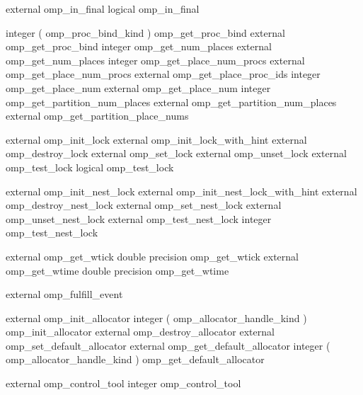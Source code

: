 {\begin{ompfSyntax}
      external omp_in_final
      logical omp_in_final

      integer ( omp_proc_bind_kind ) omp_get_proc_bind
      external omp_get_proc_bind
      integer omp_get_num_places
      external omp_get_num_places
      integer omp_get_place_num_procs
      external omp_get_place_num_procs
      external omp_get_place_proc_ids
      integer omp_get_place_num
      external omp_get_place_num
      integer omp_get_partition_num_places
      external omp_get_partition_num_places
      external omp_get_partition_place_nums

      external omp_init_lock
      external omp_init_lock_with_hint
      external omp_destroy_lock
      external omp_set_lock
      external omp_unset_lock
      external omp_test_lock
      logical omp_test_lock

      external omp_init_nest_lock
      external omp_init_nest_lock_with_hint
      external omp_destroy_nest_lock
      external omp_set_nest_lock
      external omp_unset_nest_lock
      external omp_test_nest_lock
      integer omp_test_nest_lock

      external omp_get_wtick
      double precision omp_get_wtick
      external omp_get_wtime
      double precision omp_get_wtime

      external omp_fulfill_event

      external omp_init_allocator
      integer ( omp_allocator_handle_kind ) omp_init_allocator
      external omp_destroy_allocator
      external omp_set_default_allocator
      external omp_get_default_allocator
      integer ( omp_allocator_handle_kind ) omp_get_default_allocator

      external omp_control_tool
      integer omp_control_tool
\end{ompfSyntax}}





